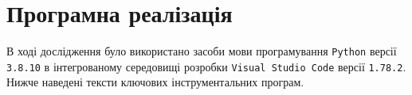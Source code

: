 \documentclass{mathreport}
\begin{document}
\newpage
\section{Програмна реалізація}

В ході дослідження було використано засоби мови програмування \texttt{Python} версії \texttt{3.8.10} в інтегрованому середовищі розробки \texttt{Visual Studio Code} версії \texttt{1.78.2}. Нижче наведені тексти ключових інструментальних програм.









\end{document}

